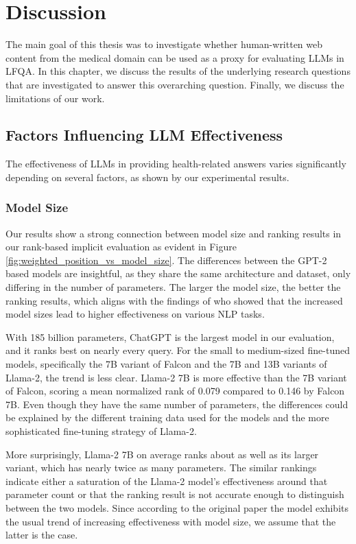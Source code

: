 \chapter{Discussion}\label{discussion}

The main goal of this thesis was to investigate whether human-written web content from the medical domain can be used as a proxy for evaluating LLMs in LFQA.
In this chapter, we discuss the results of the underlying research questions that are investigated to answer this overarching question.
Finally, we discuss the limitations of our work.

\section{Factors Influencing LLM Effectiveness}

The effectiveness of LLMs in providing health-related answers varies significantly depending on several factors, as shown by our experimental results.

\subsection{Model Size}
Our results show a strong connection between model size and ranking results in our rank-based implicit evaluation as evident in Figure \ref{fig:weighted_position_vs_model_size}. 
The differences between the GPT-2 based models are insightful, as they share the same architecture and dataset, only differing in the number of parameters.
The larger the model size, the better the ranking results, which aligns with the findings of \cite{radford:2019:language} who showed that the increased model sizes lead to higher effectiveness on various NLP tasks.

With 185 billion parameters, ChatGPT is the largest model in our evaluation, and it ranks best on nearly every query.
For the small to medium-sized fine-tuned models, specifically the 7B variant of Falcon and the 7B and 13B variants of Llama-2, the trend is less clear.
Llama-2 7B is more effective than the 7B variant of Falcon, scoring a mean normalized rank of 0.079 compared to 0.146 by Falcon 7B.
Even though they have the same number of parameters, the differences could be explained by the different training data used for the models and the more sophisticated fine-tuning strategy of Llama-2.

More surprisingly, Llama-2 7B on average ranks about as well as its larger variant, which has nearly twice as many parameters.
The similar rankings indicate either a saturation of the Llama-2 model's effectiveness around that parameter count or that the ranking result is not accurate enough to distinguish between the two models.
Since according to the original paper \cite{touvron:2023:Llama} the model exhibits the usual trend of increasing effectiveness with model size, we assume that the latter is the case.

